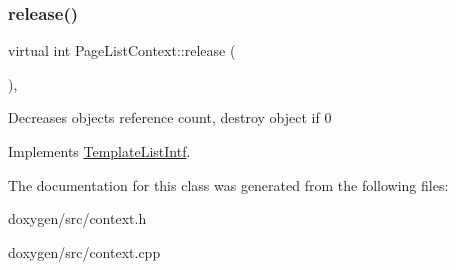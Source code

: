 \mbox{\label{class_page_list_context_aec001e0a201e3d1c168a67c80ffc8f06}} 
\subsubsection{\texorpdfstring{release()}{release()}}
{\footnotesize\ttfamily virtual int Page\+List\+Context\+::release (\begin{DoxyParamCaption}{ }\end{DoxyParamCaption})\hspace{0.3cm}{\ttfamily [inline]}, {\ttfamily [virtual]}}

Decreases object\textquotesingle{}s reference count, destroy object if 0 

Implements \mbox{\hyperlink{class_template_list_intf_a0c53169c740c09dac47efc62bbe39674}{Template\+List\+Intf}}.



The documentation for this class was generated from the following files\+:\begin{DoxyCompactItemize}
\item 
doxygen/src/context.\+h\item 
doxygen/src/context.\+cpp\end{DoxyCompactItemize}

